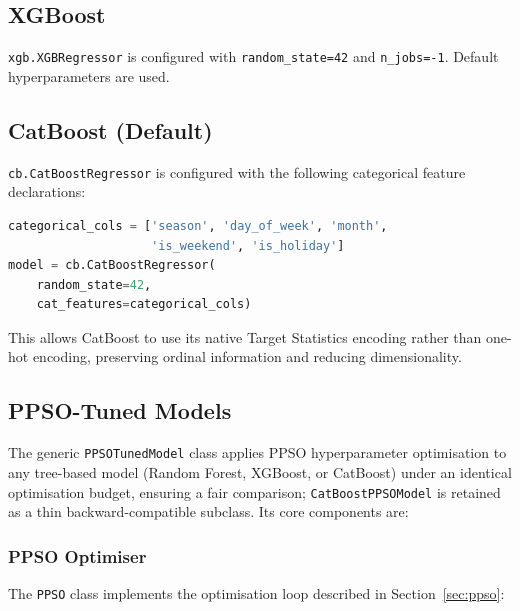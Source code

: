 \subsection{XGBoost}

\texttt{xgb.XGBRegressor} is configured with \texttt{random\_state=42} and \texttt{n\_jobs=-1}. Default hyperparameters are used.

\subsection{CatBoost (Default)}

\texttt{cb.CatBoostRegressor} is configured with the following categorical feature declarations:
\begin{lstlisting}[language=Python, caption={CatBoost categorical feature configuration.}, label={lst:catboost_cats}]
categorical_cols = ['season', 'day_of_week', 'month',
                    'is_weekend', 'is_holiday']
model = cb.CatBoostRegressor(
    random_state=42,
    cat_features=categorical_cols)
\end{lstlisting}

This allows CatBoost to use its native Target Statistics encoding rather than one-hot encoding, preserving ordinal information and reducing dimensionality.

\subsection{PPSO-Tuned Models}

The generic \texttt{PPSOTunedModel} class applies PPSO hyperparameter optimisation to any tree-based model (Random Forest, XGBoost, or CatBoost) under an identical optimisation budget, ensuring a fair comparison; \texttt{CatBoostPPSOModel} is retained as a thin backward-compatible subclass. Its core components are:

\subsubsection{PPSO Optimiser}

The \texttt{PPSO} class implements the optimisation loop described in Section~\ref{sec:ppso}:

